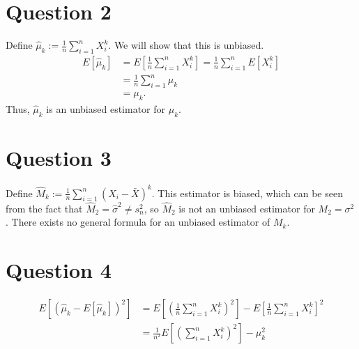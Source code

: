 \documentclass[11pt]{article} %
\begin{document}
\section{Question 2}
Define $\hat{\mu}_k:= \frac{1}{n}\sum_{i=1}^{n}X_i^k.$ We will show that this is unbiased.
\begin{align*}
E[\hat{\mu}_k] &= E\left[\frac{1}{n}\sum_{i=1}^{n}X_i^k\right] = \frac{1}{n}\sum_{i=1}^nE[X_i^k]\\
 &=\frac{1}{n}\sum_{i=1}^n\mu_k \\
&= \mu_k.
\end{align*}
Thus, $\hat{\mu}_k$ is an unbiased estimator for $\mu_k$.
\section{Question 3}
Define $\hat{M}_k:= \frac{1}{n}\sum_{i=1}^n (X_i - \bar{X})^k$. This estimator is biased, which can be seen from the fact that $\hat{M}_2 = \hat{\sigma}^2 \neq s_{n}^2$, so $\hat{M}_2$ is not an unbiased estimator for $M_2 = \sigma^2$. There exists no general formula for an unbiased estimator of $M_k.$
\section{Question 4}
\begin{align*}
E[(\hat{\mu}_k - E[\hat{\mu}_k])^2] &=  E\left[\left( \frac{1}{n}\sum_{i=1}^{n}X_i^k\right)^2\right] - E\left[\frac{1}{n}\sum_{i=1}^{n}X_i^k\right]^2 \\
&= \frac{1}{n^2}E\left[\left(\sum_{i=1}^{n}X_i^k\right)^2\right] - \mu_k^2
\end{align*}
\end{document}
